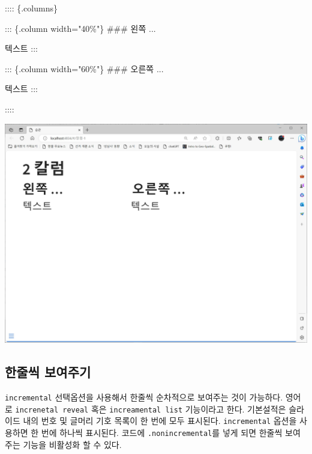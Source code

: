 \documentclass[
  letterpaper,
]{book}
\newenvironment{Shaded}{\begin{snugshade}}{\end{snugshade}}
\newcommand{\FunctionTok}[1]{\textcolor[rgb]{0.28,0.35,0.67}{#1}}
\newcommand{\NormalTok}[1]{\textcolor[rgb]{0.00,0.23,0.31}{#1}}
\begin{document}
\begin{Shaded}
\begin{Highlighting}[]
\NormalTok{:::: \{.columns\}}

\NormalTok{::: \{.column width="40\%"\}}
\FunctionTok{\#\#\# 왼쪽 ...}

\NormalTok{텍스트}
\NormalTok{:::}

\NormalTok{::: \{.column width="60\%"\}}
\FunctionTok{\#\#\# 오른쪽 ...}

\NormalTok{텍스트}
\NormalTok{:::}

\NormalTok{::::}
\end{Highlighting}
\end{Shaded}

\includegraphics{images/revealjs_2columns.jpg}

\hypertarget{uxd55cuxc904uxc529-uxbcf4uxc5ecuxc8fcuxae30}{%
\subsection{한줄씩
보여주기}\label{uxd55cuxc904uxc529-uxbcf4uxc5ecuxc8fcuxae30}}

\texttt{incremental} 선택옵션을 사용해서 한줄씩 순차적으로 보여주는 것이
가능하다. 영어로 \texttt{increnetal\ reveal} 혹은
\texttt{increamental\ list} 기능이라고 한다. 기본설적은 슬라이드 내의
번호 및 글머리 기호 목록이 한 번에 모두 표시된다. \texttt{incremental}
옵션을 사용하면 한 번에 하나씩 표시된다. 코드에
\texttt{.nonincremental}를 넣게 되면 한줄씩 보여주는 기능을 비활성화 할
수 있다.
\end{document}
